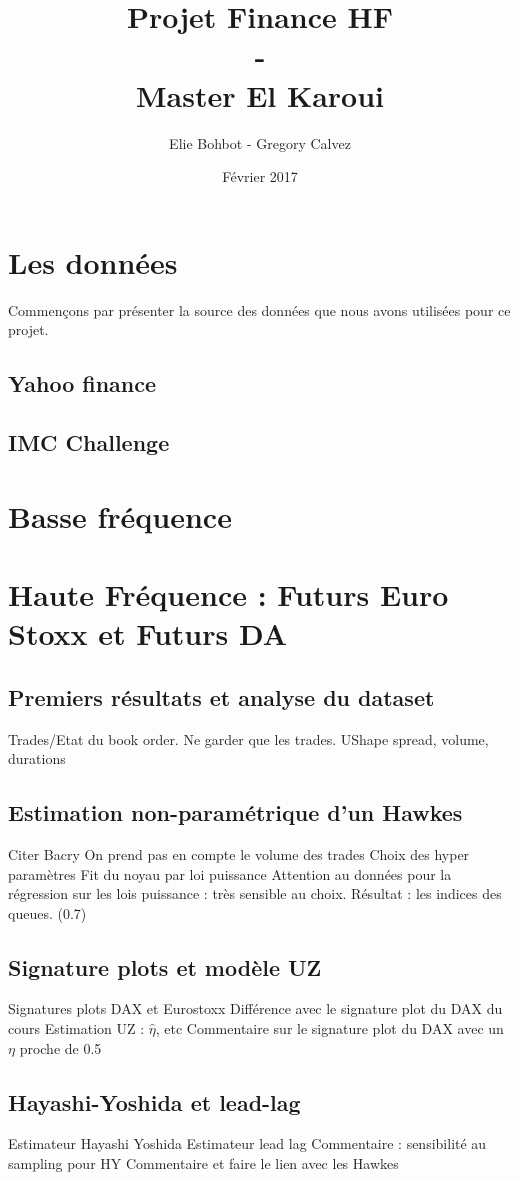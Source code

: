 \documentclass[]{article}
\title{Projet Finance HF
	\\ - \\
	Master El Karoui}
\author{Elie Bohbot - Gregory Calvez}
\date{Février 2017}
\begin{document}
	
	\maketitle
	
	\tableofcontents
	
	
	\section{Les données}
	
	Commençons par présenter la source des données que nous avons utilisées pour ce projet. 
		\subsection{Yahoo finance}
		\subsection{IMC Challenge}
	\section{Basse fréquence}
	
	\section{Haute Fréquence : Futurs Euro Stoxx et Futurs DA}
		\subsection{Premiers résultats et analyse du dataset}
			Trades/Etat du book order. Ne garder que les trades. 
			UShape spread, volume, durations
		\subsection{Estimation non-paramétrique d'un Hawkes}
			Citer Bacry
			On prend pas en compte le volume des trades
			Choix des hyper paramètres
			Fit du noyau par loi puissance
			Attention au données pour la régression sur les lois puissance : très sensible au choix. 
			Résultat : les indices des queues. (0.7)
		\subsection{Signature plots et modèle UZ}
			Signatures plots DAX et Eurostoxx
			Différence avec le signature plot du DAX du cours
			Estimation UZ : $\hat \eta$, etc
			Commentaire sur le signature plot du DAX avec un $\eta$ proche de 0.5
		\subsection{Hayashi-Yoshida et lead-lag}
			Estimateur Hayashi Yoshida
			Estimateur lead lag
			Commentaire : sensibilité au sampling pour HY
			Commentaire et faire le lien avec les Hawkes

	
\end{document}
